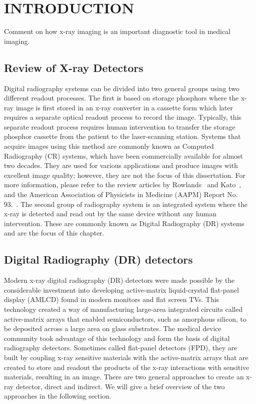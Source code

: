 \chapter{INTRODUCTION}
\label{chap:intro}

Comment on how x-ray imaging is an important diagnostic tool in medical imaging. 

\section{Review of X-ray Detectors}
\label{sect:review_x-ray_det}
Digital radiography systems can be divided into two general groups using two different readout processes.  The first is based on storage phosphors where the x-ray image is first stored in an x-ray converter in a cassette form which later requires a separate optical readout process to record the image.  Typically, this separate readout process requires human intervention to transfer the storage phosphor cassette from the patient to the laser-scanning station.  Systems that acquire images using this method are commonly known as Computed Radiography (CR) systems, which have been commercially available for almost two decades.  They are used for various applications and produce images with excellent image quality; however, they are not the focus of this dissertation.  For more information, please refer to the review articles by Rowlands~\citep{Rowlands2002} and Kato~\citep{kato1994}, and the American Association of Physicists in Medicine (AAPM) Report No. 93.~\citep{AAPM93}.  The second group of radiography system is an integrated system where the x-ray is detected and read out by the same device without any human intervention.  These are commonly known as Digital Radiography (DR) systems and are the focus of this chapter.

\section{Digital Radiography (DR) detectors}
Modern x-ray digital radiography (DR) detectors were made possible by the considerable investment into developing active-matrix liquid-crystal flat-panel display (AMLCD) found in modern monitors and flat screen TVs.  This technology created a way of manufacturing large-area integrated circuits called active-matrix arrays that enabled semiconductors, such as amorphous silicon, to be deposited across a large area on glass substrates.  The medical device community took advantage of this technology and form the basis of digital radiography detectors.  Sometimes called flat-panel detectors (FPD), they are built by coupling x-ray sensitive materials with the active-matrix arrays that are created to store and readout the products of the x-ray interactions with sensitive materials, resulting in an image.  There are two general approaches to create an x-ray detector, direct and indirect.  We will give a brief overview of the two approaches in the following section.

